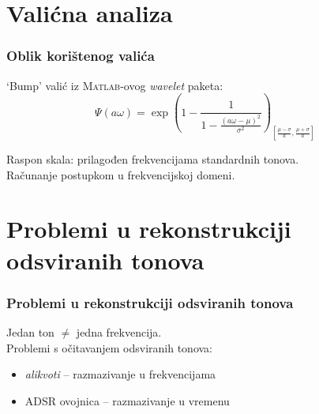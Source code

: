 \documentclass[11pt]{beamer}
\begin{document}
  \section{Valićna analiza}
  \begin{frame}
    \frametitle{Oblik korištenog valića}
    `Bump' valić iz \textsc{Matlab}-ovog \textit{wavelet} paketa:
    $$ \Psi\left( a \omega \right) = \exp\left( 1 - \frac{1}{1 - \frac{\left(a \omega - \mu \right)^2}{\sigma^2}} \right)_{\left[ \frac{\mu - \sigma}{a}, \frac{\mu + \sigma}{a} \right]} $$
    
    Raspon skala: prilagođen frekvencijama standardnih tonova.\\
    \vspace{10pt}
    Računanje postupkom u frekvencijskoj domeni.
  \end{frame}

  \section{Problemi u rekonstrukciji odsviranih tonova}
  \begin{frame}
    \frametitle{Problemi u rekonstrukciji odsviranih tonova}
    Jedan ton $\ne$ jedna frekvencija.\\
    \vspace{10pt}
    Problemi s očitavanjem odsviranih tonova:
    \begin{itemize}
      \item \textit{alikvoti} -- razmazivanje u frekvencijama
      \item ADSR ovojnica -- razmazivanje u vremenu
    \end{itemize}
  \end{frame}
  
\end{document}
